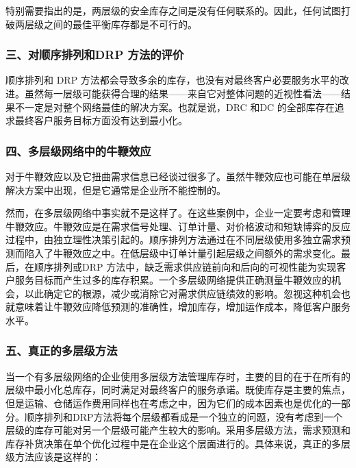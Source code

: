     特别需要指出的是，两层级的安全库存之间是没有任何联系的。因此，任何试图打破两层级之间的最佳平衡库存都是不可行的。

\subsubsection { 三、对顺序排列和DRP 方法的评价}

    顺序排列和 DRP 方法都会导致多余的库存，也没有对最终客户必要服务水平的改进。虽然每一层级可能获得合理的结果——来自它对整体问题的近视性看法——结果不一定是对整个网络最佳的解决方案。也就是说，DRC 和DC 的全部库存在追求最终客户服务目标方面没有达到最小化。

\subsubsection { 四、多层级网络中的牛鞭效应}

    对于牛鞭效应以及它扭曲需求信息已经谈过很多了。虽然牛鞭效应也可能在单层级解决方案中出现，但是它通常是企业所不能控制的。

    然而，在多层级网络中事实就不是这样了。在这些案例中，企业一定要考虑和管理牛鞭效应。牛鞭效应是在需求信号处理、订单计量、对价格波动和短缺博弈的反应过程中，由独立理性决策引起的。顺序排列方法通过在不同层级使用多独立需求预测而陷入了牛鞭效应之中。在低层级中订单计量引起层级之间额外的需求变化。最后，在顺序排列或DRP 方法中，缺乏需求供应链前向和后向的可视性能为实现客户服务目标而产生过多的库存积累。一个多层级网络提供正确测量牛鞭效应的机会，以此确定它的根源，减少或消除它对需求供应链绩效的影响。忽视这种机会也就意味着让牛鞭效应降低预测的准确性，增加库存，增加运作成本，降低客户服务水平。

\subsubsection { 五、真正的多层级方法}

    当一个有多层级网络的企业使用多层级方法管理库存时，主要的目的在于在所有的层级中最小化总库存，同时满足对最终客户的服务承诺。既使库存是主要的焦点，但是运输、仓储运作费用同样也在考虑之中，因为它们的成本因素也是优化的一部分。顺序排列和DRP方法将每个层级都看成是一个独立的问题，没有考虑到一个层级的库存可能对另一个层级可能产生较大的影响。采用多层级方法，需求预测和库存补货决策在单个优化过程中是在企业这个层面进行的。具体来说，真正的多层级方法应该是这样的：

